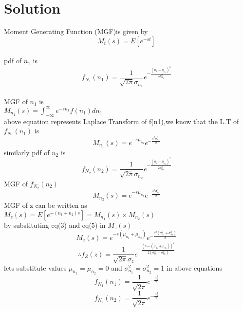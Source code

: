 \documentclass[journal,12pt,twocolumn]{IEEEtran}
\begin{document}
\section{Solution}
Moment Generating Function (MGF)is given by 
\begin{equation}
   M_t(s)=E[e^{-st}] 
\end{equation}\\
pdf of $n_1$ is 
\begin{equation}
    f_{N_1}(n_1)=\frac{1}{\sqrt{2\pi}\sigma_{n_1}}e^{-\frac{(n_1-\mu_{n_1})^2}{2\sigma_{n_1}^2}}
\end{equation} \\
MGF of $n_1$ is \\
$M_{n_1}(s)=\int_{-\infty}^{\infty}e^{-s n_1}f({n_1}) d{n_1} $ \\
above equation represents Laplace Transform of f(n1),we know that the L.T of $f_{N_1}(n_1)$ is
\begin{equation}
      M_{n_1}(s)=e^{-s\mu_{n_1}}e^{-\frac{s^2\sigma_{n_1}^2}{2}}
\end{equation}
similarly pdf of $n_2$ is
\begin{equation}
    f_{N_2}(n_2)=\frac{1}{\sqrt{2\pi}\sigma_{n_2}}e^{-\frac{(n_2-\mu_{n_2})^2}{2\sigma_{n_2}^2}}
\end{equation}
MGF of $f_{N_2}(n_2)$
\begin{equation}
    M_{n_2}(s)=e^{-s\mu_{n_2}}e^{-\frac{s^2\sigma_{n_2}^2}{2}}
\end{equation}
MGF of z can be written as \\
$M_z(s)=E[e^{-(n_1+n_2)s}]=M_{n_1}(s)\times M_{n_2}(s)$\\
by substituting eq(3) and eq(5) in $M_z(s)$\\
\begin{equation}
    M_z(s)=e^{-s(\mu_{n_1}+\mu_{n_2})}e^{-\frac{s^2(\sigma_{n_1}^2+\sigma_{n_2}^2)}{2}}
\end{equation} 
\begin{equation}
   \therefore f_Z(z)=\frac{1}{\sqrt{2\pi}\sigma_z}e^{-\frac{(z-(\mu_{n_1}+\mu_{n_2}))^2}{2(\sigma_{n_1}^2+\sigma_{n_2}^2)}}
\end{equation}
lets substitute values $\mu_{n_1}=\mu_{n_2}=0$ and $\sigma_{n_1}^2=\sigma_{n_2}^2=1$ in above equations
\begin{equation}
    f_{N_1}(n_1)=\frac{1}{\sqrt{2\pi}}e^{-\frac{n_1^2}{2}}
\end{equation}
\begin{equation}
    f_{N_2}(n_2)=\frac{1}{\sqrt{2\pi}}e^{-\frac{n_2^2}{2}}
\end{equation}
\end{document}

